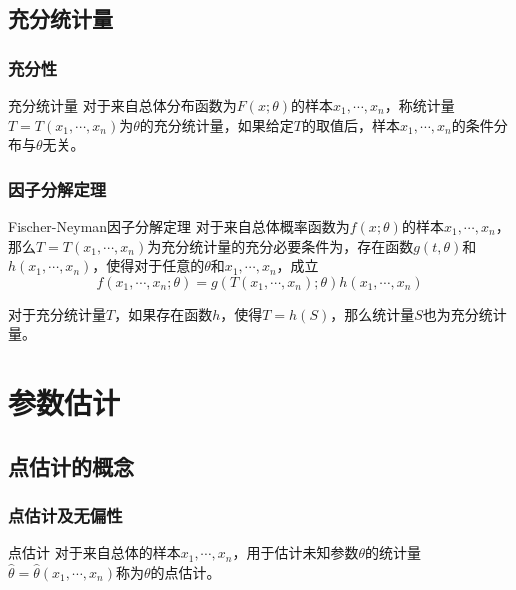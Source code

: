\documentclass[lang = cn, scheme = chinese, thmcnt = section]{elegantbook}
\begin{document}
\section{充分统计量}

\subsection{充分性}

\begin{definition}{充分统计量}
	对于来自总体分布函数为$F(x;\theta)$的样本$x_1,\cdots,x_n$，称统计量$T=T(x_1,\cdots,x_n)$为$\theta$的充分统计量，如果给定$T$的取值后，样本$x_1,\cdots,x_n$的条件分布与$\theta$无关。
\end{definition}

\subsection{因子分解定理}

\begin{theorem}{Fischer-Neyman因子分解定理}
	对于来自总体概率函数为$f(x;\theta)$的样本$x_1,\cdots,x_n$，那么$T=T(x_1,\cdots,x_n)$为充分统计量的充分必要条件为，存在函数$g(t,\theta)$和$h(x_1,\cdots,x_n)$，使得对于任意的$\theta$和$x_1,\cdots,x_n$，成立
	$$
	f(x_1,\cdots,x_n;\theta)=g(T(x_1,\cdots,x_n);\theta)h(x_1,\cdots,x_n)
	$$
\end{theorem}

\begin{theorem}
	对于充分统计量$T$，如果存在函数$h$，使得$T=h(S)$，那么统计量$S$也为充分统计量。
\end{theorem}

\chapter{参数估计}

\section{点估计的概念}

\subsection{点估计及无偏性}

\begin{definition}{点估计}
	对于来自总体的样本$x_1,\cdots,x_n$，用于估计未知参数$\theta$的统计量$\hat{\theta}=\hat{\theta}(x_1,\cdots,x_n)$称为$\theta$的点估计。
\end{definition}
\end{document}
